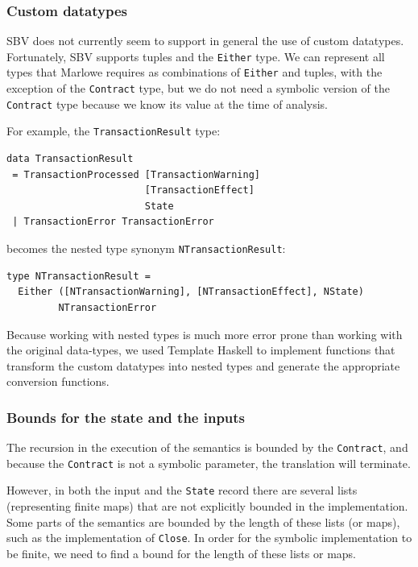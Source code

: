 \documentclass[runningheads]{llncs}
\begin{document}
\subsubsection{Custom datatypes}

SBV does not currently seem to support in general the use of custom datatypes. Fortunately, SBV supports tuples and the \texttt{Either} type. We can represent all types that Marlowe requires as combinations of \texttt{Either} and tuples, with the exception of the \texttt{Contract} type, but we do not need a symbolic version of the \texttt{Contract} type because we know its value at the time of analysis.

\noindent
For example, the \texttt{TransactionResult} type:
\begin{verbatim}
data TransactionResult
 = TransactionProcessed [TransactionWarning]
                        [TransactionEffect]
                        State
 | TransactionError TransactionError
\end{verbatim}
\noindent
becomes the nested type synonym \texttt{NTransactionResult}:

\begin{verbatim}
type NTransactionResult =
  Either ([NTransactionWarning], [NTransactionEffect], NState)
         NTransactionError
\end{verbatim}

\noindent
Because working with nested types is much more error prone than working with the original data-types, we used Template Haskell \cite{sheard2002template} to implement functions that transform the custom datatypes into nested types and generate the appropriate conversion functions.

\subsubsection{Bounds for the state and the inputs}

The recursion in the execution of the semantics is bounded by the \texttt{Contract}, and because the \texttt{Contract} is not a symbolic parameter, the translation will terminate.

However, in both the input and the \texttt{State} record there are several lists (representing finite maps) that are not explicitly bounded in the implementation. Some parts of the semantics are bounded by the length of these lists (or maps), such as the implementation of \texttt{Close}.
In order for the symbolic implementation to be finite, we need to find a bound for the length of these lists or maps.
\end{document}
